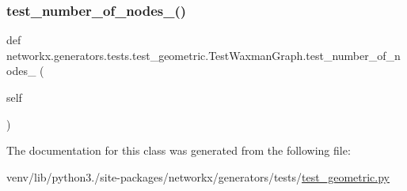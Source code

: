 \subsubsection{\texorpdfstring{test\+\_\+number\+\_\+of\+\_\+nodes\+\_()}{test\_number\_of\_nodes\_2()}}
{\footnotesize\ttfamily def networkx.\+generators.\+tests.\+test\+\_\+geometric.\+Test\+Waxman\+Graph.\+test\+\_\+number\+\_\+of\+\_\+nodes\+\_ (\begin{DoxyParamCaption}\item[{}]{self }\end{DoxyParamCaption})}



The documentation for this class was generated from the following file\+:\begin{DoxyCompactItemize}
\item 
venv/lib/python3./site-\/packages/networkx/generators/tests/\hyperlink{test__geometric_8py}{test\+\_\+geometric.\+py}\end{DoxyCompactItemize}

